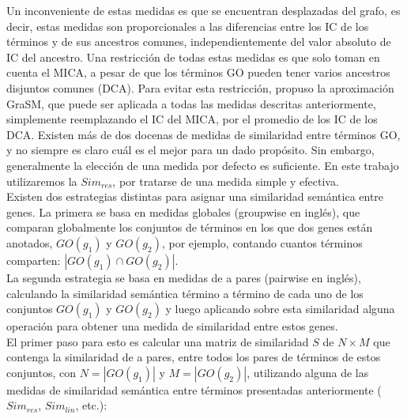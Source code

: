 Un inconveniente de estas medidas es que se encuentran desplazadas del grafo, es decir, estas medidas son proporcionales a las diferencias entre los IC de los términos y de sus ancestros comunes, independientemente del valor absoluto de IC del ancestro.
Una restricción de todas estas medidas es que solo toman en cuenta el MICA, a pesar de que los términos GO pueden tener varios ancestros disjuntos comunes (DCA). Para evitar esta restricción, \cite{Pesquita2009} propuso la aproximación GraSM, que puede ser aplicada a todas las medidas descritas anteriormente, simplemente reemplazando el IC del MICA, por el promedio de los IC de los DCA. 
Existen más de dos docenas de medidas de similaridad entre términos GO, y no siempre es claro cuál es el mejor para un dado propósito. Sin embargo, generalmente la elección de una medida por defecto es suficiente\cite{Bose2016}. En este trabajo utilizaremos la $Sim_{res}$, por tratarse de una medida simple y efectiva.\\
Existen dos estrategias distintas para asignar una similaridad semántica entre genes. La primera se basa en medidas globales (groupwise en inglés), que comparan globalmente los conjuntos de términos en los que dos genes están anotados, $GO(g_1)$ y $GO(g_2)$, por ejemplo, contando cuantos términos comparten: $|GO(g_1) \cap GO(g_2)|$.\cite{Lee2004} \\
La segunda estrategia se basa en medidas de a pares (pairwise en inglés), calculando la similaridad semántica término a término de cada uno de los conjuntos $GO(g_1)$ y $GO(g_2)$ y luego aplicando sobre esta similaridad alguna operación para obtener una medida de similaridad entre estos genes.\\
El primer paso para esto es calcular una matriz de similaridad $S$ de $N\times M$ que contenga la similaridad de a pares, entre todos los pares de términos de estos conjuntos, con $N=|GO(g_1)|$ y $M=|GO(g_2)|$, utilizando alguna de las medidas de similaridad semántica entre términos presentadas anteriormente ($Sim_{res}$, $Sim_{lin}$, etc.):

